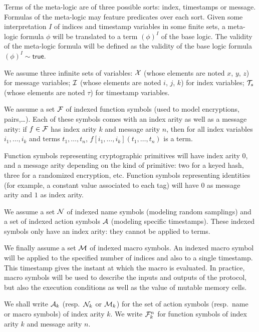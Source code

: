 Terms of the meta-logic are of three possible sorts: index, timestamps
or message. Formulas of the meta-logic may feature predicates over each sort.
Given some interpretation $I$ of indices and timestamp variables in some finite
sets, a meta-logic formula $\phi$ will be translated to a term $(\phi)^I$
of the base logic.
The validity of the meta-logic formula will be defined as the validity of the
base logic formula $(\phi)^I \sim \mathsf{true}$.

\medskip

We assume three infinite sets of variables:
$\mathcal{X}$ (whose elements are noted $x$, $y$, $z$) for message variables;
$\mathcal{I}$ (whose elements are noted $i$, $j$, $k$) for index variables;
${\mathcal{T}_s}$ (whose elements are noted $\tau$) for timestamp variables.

We assume a set $\mathcal{F}$ of indexed function symbols
(used to model encryptions, pairs,\dots).
Each of these symbols comes with an index arity as well as a message arity:
if $f\in\mathcal{F}$ has index arity $k$ and message arity $n$,
then for all index variables $i_1,\ldots,i_k$ and terms $t_1,\ldots,t_n$,
$f[i_1,\ldots,i_k](t_1,\ldots,t_n)$ is a term.

\begin{example}
  Function symbols representing cryptographic primitives will have index
  arity $0$, and a message arity depending on the kind of primitive:
  two for a keyed hash, three for a randomized encryption, etc.
  Function symbols representing identities (for example, a constant value
  associated to each tag) will have $0$ as message arity and $1$ as index arity.
\end{example}

We assume a set $\mathcal{N}$ of indexed name symbols
(modeling random samplings)
and a set of indexed action symbols $\mathcal{A}$
(modeling specific timestamps).
These indexed symbols only have an index arity: they
cannot be applied to terms.

We finally assume a set $\mathcal{M}$ of indexed macro symbols.
An indexed macro symbol will be applied to the specified number of
indices and also to a single timestamp.
This timestamp gives the instant at which the macro is evaluated.
In practice, macro symbols will be used to describe the inputs and outputs
of the protocol, but also the execution conditions as well as the value of
mutable memory cells.

We shall write $\mathcal{A}_k$ (resp.\ $\mathcal{N}_k$ or $\mathcal{M}_k$) for the set of action
symbols (resp.\ name or macro symbols) of index arity $k$.
We write $\mathcal{F}_k^n$ for function symbols of index arity $k$ and message
arity $n$.

